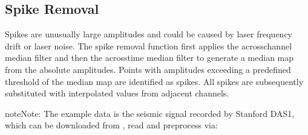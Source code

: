 \documentclass[letterpaper,10pt,english]{sphinxmanual}
\begin{document}
\subsection{Spike Removal}
\label{\detokenize{Denoising:spike-removal}}\label{\detokenize{Denoising:id1}}
\sphinxAtStartPar
Spikes are unusually large amplitudes and could be caused by laser frequency drift or laser noise. The spike removal function first applies the across\sphinxhyphen{}channel median filter and then the across\sphinxhyphen{}time median filter to generate a median map from the absolute amplitudes. Points with amplitudes exceeding a predefined threshold of the median map are identified as spikes. All spikes are subsequently substituted with interpolated values from adjacent channels.

\begin{sphinxadmonition}{note}{Note:}
\sphinxAtStartPar
The example data is the seismic signal recorded by Stanford DAS\sphinxhyphen{}1, which can be downloaded from  , read and preprocess via:

\begin{sphinxVerbatim}[commandchars=\\\{\}]
    
   
  
        
       
 
 
\end{sphinxVerbatim}
\end{sphinxadmonition}
\end{document}

